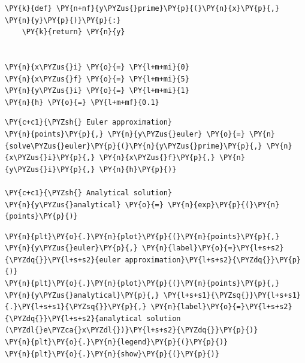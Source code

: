     \begin{tcolorbox}[breakable, size=fbox, boxrule=1pt, pad at break*=1mm,colback=cellbackground, colframe=cellborder]
\begin{Verbatim}[commandchars=\\\{\}]
\PY{k}{def} \PY{n+nf}{y\PYZus{}prime}\PY{p}{(}\PY{n}{x}\PY{p}{,} \PY{n}{y}\PY{p}{)}\PY{p}{:}
    \PY{k}{return} \PY{n}{y}


\PY{n}{x\PYZus{}i} \PY{o}{=} \PY{l+m+mi}{0}
\PY{n}{x\PYZus{}f} \PY{o}{=} \PY{l+m+mi}{5}
\PY{n}{y\PYZus{}i} \PY{o}{=} \PY{l+m+mi}{1}
\PY{n}{h} \PY{o}{=} \PY{l+m+mf}{0.1}
\end{Verbatim}
\end{tcolorbox}

    \begin{tcolorbox}[breakable, size=fbox, boxrule=1pt, pad at break*=1mm,colback=cellbackground, colframe=cellborder]
\begin{Verbatim}[commandchars=\\\{\}]
\PY{c+c1}{\PYZsh{} Euler approximation}
\PY{n}{points}\PY{p}{,} \PY{n}{y\PYZus{}euler} \PY{o}{=} \PY{n}{solve\PYZus{}euler}\PY{p}{(}\PY{n}{y\PYZus{}prime}\PY{p}{,} \PY{n}{x\PYZus{}i}\PY{p}{,} \PY{n}{x\PYZus{}f}\PY{p}{,} \PY{n}{y\PYZus{}i}\PY{p}{,} \PY{n}{h}\PY{p}{)}

\PY{c+c1}{\PYZsh{} Analytical solution}
\PY{n}{y\PYZus{}analytical} \PY{o}{=} \PY{n}{exp}\PY{p}{(}\PY{n}{points}\PY{p}{)}
\end{Verbatim}
\end{tcolorbox}

    \begin{tcolorbox}[breakable, size=fbox, boxrule=1pt, pad at break*=1mm,colback=cellbackground, colframe=cellborder]
\begin{Verbatim}[commandchars=\\\{\}]
\PY{n}{plt}\PY{o}{.}\PY{n}{plot}\PY{p}{(}\PY{n}{points}\PY{p}{,} \PY{n}{y\PYZus{}euler}\PY{p}{,} \PY{n}{label}\PY{o}{=}\PY{l+s+s2}{\PYZdq{}}\PY{l+s+s2}{euler approximation}\PY{l+s+s2}{\PYZdq{}}\PY{p}{)}
\PY{n}{plt}\PY{o}{.}\PY{n}{plot}\PY{p}{(}\PY{n}{points}\PY{p}{,} \PY{n}{y\PYZus{}analytical}\PY{p}{,} \PY{l+s+s1}{\PYZsq{}}\PY{l+s+s1}{.}\PY{l+s+s1}{\PYZsq{}}\PY{p}{,} \PY{n}{label}\PY{o}{=}\PY{l+s+s2}{\PYZdq{}}\PY{l+s+s2}{analytical solution (\PYZdl{}e\PYZca{}x\PYZdl{})}\PY{l+s+s2}{\PYZdq{}}\PY{p}{)}
\PY{n}{plt}\PY{o}{.}\PY{n}{legend}\PY{p}{(}\PY{p}{)}
\PY{n}{plt}\PY{o}{.}\PY{n}{show}\PY{p}{(}\PY{p}{)}
\end{Verbatim}
\end{tcolorbox}

